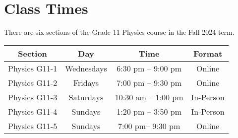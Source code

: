 \documentclass{../oss-handout}
\begin{document}
\section{Class Times}
There are six sections of the Grade 11 Physics course in the Fall 2024 term.
\begin{center}
  \bgroup
  \def\arraystretch{1.25}
  \begin{tabular}{|c|c|c|c|}
    \hline
    \rowcolor{lightgray}
    \textbf{Section} & \textbf{Day} & \textbf{Time} & \textbf{Format}\\
    \hline\hline

    Physics G11-1 & Wednesdays & 6:30 pm -- 9:00 pm & Online \\
    \hline
    Physics G11-2 & Fridays & 7:00 pm -- 9:30 pm & Online \\
    \hline
    Physics G11-3 & Saturdays & 10:30 am -- 1:00 pm & In-Person \\
    \hline
    Physics G11-4 & Sundays  & 1:20 pm -- 3:50 pm & In-Person \\
    \hline
    Physics G11-5 & Sundays  & 7:00 pm-- 9:30 pm & Online \\
    \hline

    
    

\end{tabular}
\end{center}
\end{document}
